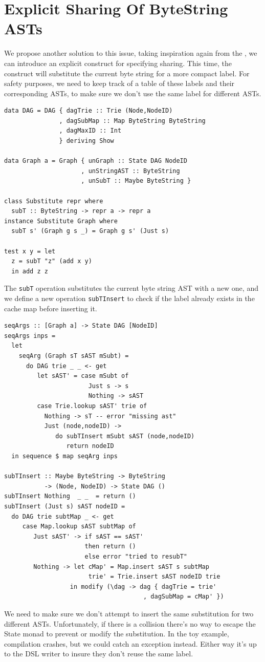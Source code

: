 \documentclass[runningheads]{llncs}
\begin{document}
\section{Explicit Sharing Of ByteString ASTs}
We propose another solution to this issue, taking inspiration again from the
\cite{kiselyov:sharing}, we can introduce an explicit construct for specifying
sharing. This time, the construct will substitute the current byte string for a
more compact label. For safety purposes, we need to keep track of a table of
these labels and their corresponding ASTs, to make sure we don't use the same label for different ASTs.
\begin{verbatim}
data DAG = DAG { dagTrie :: Trie (Node,NodeID)
               , dagSubMap :: Map ByteString ByteString
               , dagMaxID :: Int
               } deriving Show

data Graph a = Graph { unGraph :: State DAG NodeID
                     , unStringAST :: ByteString
                     , unSubT :: Maybe ByteString }

class Substitute repr where
  subT :: ByteString -> repr a -> repr a
instance Substitute Graph where
  subT s' (Graph g s _) = Graph g s' (Just s)

test x y = let
  z = subT "z" (add x y)
  in add z z
\end{verbatim}

The \texttt{subT} operation substitutes the current byte string AST with a new one, and
we define a new operation \texttt{subTInsert} to check if
the label already exists in the cache map before inserting it.
\begin{verbatim}
seqArgs :: [Graph a] -> State DAG [NodeID]
seqArgs inps =
  let
    seqArg (Graph sT sAST mSubt) =
      do DAG trie _ _ <- get
         let sAST' = case mSubt of
                       Just s -> s
                       Nothing -> sAST
         case Trie.lookup sAST' trie of
           Nothing -> sT -- error "missing ast"
           Just (node,nodeID) ->
              do subTInsert mSubt sAST (node,nodeID)
                 return nodeID
  in sequence $ map seqArg inps

subTInsert :: Maybe ByteString -> ByteString
           -> (Node, NodeID) -> State DAG ()
subTInsert Nothing  _ _  = return ()
subTInsert (Just s) sAST nodeID =
  do DAG trie subtMap _ <- get
     case Map.lookup sAST subtMap of
        Just sAST' -> if sAST == sAST'
                      then return ()
                      else error "tried to resubT"
        Nothing -> let cMap' = Map.insert sAST s subtMap
                       trie' = Trie.insert sAST nodeID trie
                  in modify (\dag -> dag { dagTrie = trie'
                                      , dagSubMap = cMap' })
\end{verbatim}
We need to make sure we don't attempt to insert the same substitution for two
different ASTs. Unfortunately, if there is a collision there's no way to escape
the State monad to prevent or modify the substitution.
In the toy example, compilation crashes, but we could catch an exception instead.
Either way it's up to the DSL
writer to insure they don't reuse the same label.
\end{document}
